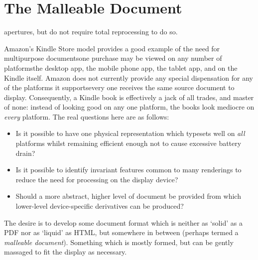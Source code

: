 \chapter{The Malleable Document}\label{ch:malleable}  %
apertures, but do not require total reprocessing to do so.



Amazon's Kindle Store model provides a good example of the need for multipurpose documents\ed one
purchase may be viewed on any number of platforms\ed the desktop app, the mobile phone app, the
tablet app, and on the Kindle itself. Amazon does not currently provide any special dispensation for
any of the platforms it supports\ed every one receives the same source document to display.
Consequently, a Kindle book is effectively a jack of all trades, and master of none: instead of
looking good on any one platform, the books look mediocre on \emph{every} platform. The real
questions here are as follows:

\begin{itemize}
 \item Is it possible to have one physical representation which typesets well on \emph{all}
platforms whilst remaining efficient enough not to cause excessive battery drain?
 \item Is it possible to identify invariant features common to many renderings to reduce the need
for processing on the display device?
 \item Should a more abstract, higher level of document be provided from which lower-level
device-specific derivatives can be produced?
\end{itemize}
  
The desire is to develop some document format which is neither as `solid' as a PDF nor as `liquid'
as HTML, but somewhere in between (perhaps termed a \emph{malleable document}). Something which is
mostly formed, but can be gently massaged to fit the display as necessary.


